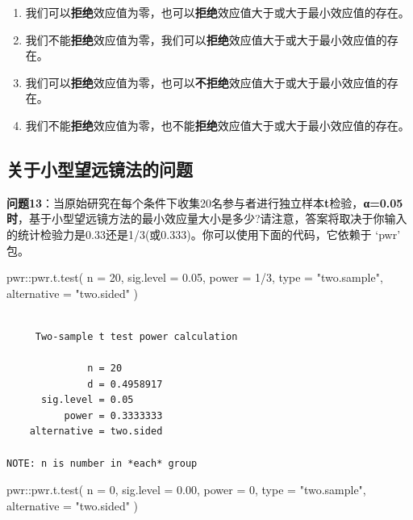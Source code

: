 \documentclass[
  letterpaper,
  DIV=11,
  numbers=noendperiod]{scrreprt}
\newenvironment{Shaded}{\begin{snugshade}}{\end{snugshade}}
\newcommand{\AttributeTok}[1]{\textcolor[rgb]{0.40,0.45,0.13}{#1}}
\newcommand{\DecValTok}[1]{\textcolor[rgb]{0.68,0.00,0.00}{#1}}
\newcommand{\FloatTok}[1]{\textcolor[rgb]{0.68,0.00,0.00}{#1}}
\newcommand{\FunctionTok}[1]{\textcolor[rgb]{0.28,0.35,0.67}{#1}}
\newcommand{\NormalTok}[1]{\textcolor[rgb]{0.00,0.23,0.31}{#1}}
\newcommand{\SpecialCharTok}[1]{\textcolor[rgb]{0.37,0.37,0.37}{#1}}
\newcommand{\StringTok}[1]{\textcolor[rgb]{0.13,0.47,0.30}{#1}}
\providecommand{\tightlist}{%
  \setlength{\itemsep}{0pt}\setlength{\parskip}{0pt}}\usepackage{longtable,booktabs,array}
\begin{document}
\begin{enumerate}
\def\labelenumi{\Alph{enumi})}
\tightlist
\item
  我们可以\textbf{拒绝}效应值为零，也可以\textbf{拒绝}效应值大于或大于最小效应值的存在。
\item
  我们不能\textbf{拒绝}效应值为零，我们可以\textbf{拒绝}效应值大于或大于最小效应值的存在。
\item
  我们可以\textbf{拒绝}效应值为零，也可以\textbf{不拒绝}效应值大于或大于最小效应值的存在。
\item
  我们不能\textbf{拒绝}效应值为零，也不能\textbf{拒绝}效应值大于或大于最小效应值的存在。
\end{enumerate}

\hypertarget{ux5173ux4e8eux5c0fux578bux671bux8fdcux955cux6cd5ux7684ux95eeux9898}{%
\subsection{关于小型望远镜法的问题}\label{ux5173ux4e8eux5c0fux578bux671bux8fdcux955cux6cd5ux7684ux95eeux9898}}

\textbf{问题13}：当原始研究在每个条件下收集20名参与者进行独立样本\textbf{t}检验，\textbf{α=0.05时}，基于小型望远镜方法的最小效应量大小是多少?请注意，答案将取决于你输入的统计检验力是0.33还是1/3(或0.333)。你可以使用下面的代码，它依赖于
`pwr' 包。

\begin{Shaded}
\begin{Highlighting}[]
\NormalTok{pwr}\SpecialCharTok{::}\FunctionTok{pwr.t.test}\NormalTok{(}
  \AttributeTok{n =} \DecValTok{20}\NormalTok{,}
  \AttributeTok{sig.level =} \FloatTok{0.05}\NormalTok{,}
  \AttributeTok{power =} \DecValTok{1}\SpecialCharTok{/}\DecValTok{3}\NormalTok{,}
  \AttributeTok{type =} \StringTok{"two.sample"}\NormalTok{,}
  \AttributeTok{alternative =} \StringTok{"two.sided"}
\NormalTok{)}
\end{Highlighting}
\end{Shaded}

\begin{verbatim}

     Two-sample t test power calculation 

              n = 20
              d = 0.4958917
      sig.level = 0.05
          power = 0.3333333
    alternative = two.sided

NOTE: n is number in *each* group
\end{verbatim}

\begin{Shaded}
\begin{Highlighting}[]
\NormalTok{pwr}\SpecialCharTok{::}\FunctionTok{pwr.t.test}\NormalTok{(}
  \AttributeTok{n =} \DecValTok{0}\NormalTok{, }
  \AttributeTok{sig.level =} \FloatTok{0.00}\NormalTok{, }
  \AttributeTok{power =} \DecValTok{0}\NormalTok{, }
  \AttributeTok{type =} \StringTok{"two.sample"}\NormalTok{,}
  \AttributeTok{alternative =} \StringTok{"two.sided"}
\NormalTok{)}
\end{Highlighting}
\end{Shaded}
\end{document}
